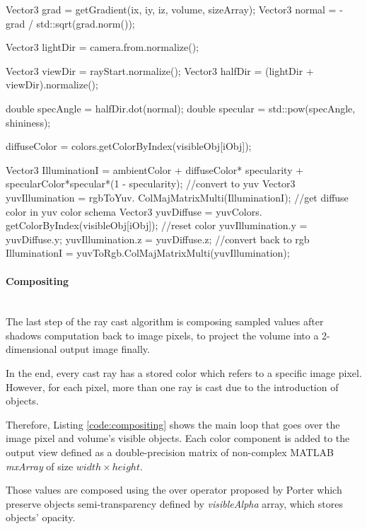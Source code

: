 \documentclass[12pt,a4paper]{extarticle}
\newcommand{\linespace}{\vspace{0pt}}
\newcommand{\myparagraph}[1]{\paragraph{#1}\mbox{}\\}
\begin{document}
\begin{cpp}[caption={Blinn-Phong reflection computation using voxel's gradient as surface normal and colors in YUV space to preserve selected input color but not luminosity},label=code:shadowing]
Vector3 grad = getGradient(ix, iy, iz, volume, sizeArray);
Vector3 normal = -grad / std::sqrt(grad.norm());

Vector3 lightDir = camera.from.normalize();

Vector3 viewDir = rayStart.normalize();
Vector3 halfDir = (lightDir + viewDir).normalize();

double specAngle = halfDir.dot(normal);
double specular = std::pow(specAngle, shininess);

diffuseColor = colors.getColorByIndex(visibleObj[iObj]);

Vector3 IlluminationI = ambientColor + diffuseColor* 
specularity + specularColor*specular*(1 - specularity);
//convert to yuv
Vector3 yuvIllumination = rgbToYuv.
		ColMajMatrixMulti(IlluminationI);
//get diffuse color in yuv color schema
Vector3 yuvDiffuse = yuvColors.
		getColorByIndex(visibleObj[iObj]);
//reset color
yuvIllumination.y = yuvDiffuse.y;
yuvIllumination.z = yuvDiffuse.z;
//convert back to rgb
IlluminationI = yuvToRgb.ColMajMatrixMulti(yuvIllumination);
\end{cpp}

\myparagraph{Compositing} The last step of the ray cast algorithm is composing sampled values after shadows computation back to image pixels, to project the volume into a 2-dimensional output image finally.

In the end, every cast ray has a stored color which refers to a specific image pixel. However, for each pixel, more than one ray is cast due to the introduction of objects.
\linespace

Therefore, Listing \ref{code:compositing} shows the main loop that goes over the image pixel and volume's visible objects. Each color component is added to the output view defined as a double-precision matrix of non-complex MATLAB \textit{mxArray} of size $width\times height$. 

Those values are composed using the over operator proposed by Porter which preserve objects semi-transparency defined by \textit{visibleAlpha} array, which stores objects' opacity. 
\end{document}
